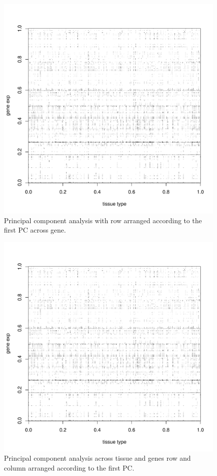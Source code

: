 \documentclass{article}
\begin{document}
\begin{figure}[ht]
	\begin{center}
		\includegraphics[scale=0.7]{interactionMatrixGenePC.pdf}
	\end{center}
	\caption{Principal component analysis with row arranged according to the first PC across gene.}
	\label{fig:intMPCG}
\end{figure}


\begin{figure}[ht]
	\begin{center}
		\includegraphics[scale=0.7]{interactionMatrixTissueGenePC.pdf}
	\end{center}
	\caption{Principal component analysis across tissue and genes row  and column arranged according to the first PC.}
	\label{fig:intMPCA}
\end{figure}
\end{document}
